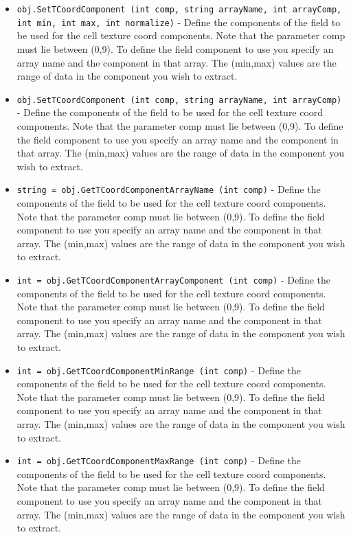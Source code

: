 \begin{itemize}
\item  \verb|obj.SetTCoordComponent (int comp, string arrayName, int arrayComp, int min, int max, int normalize)| -  Define the components of the field to be used for the cell texture coord
 components.  Note that the parameter comp must lie between (0,9). To
 define the field component to use you specify an array name and the
 component in that array. The (min,max) values are the range of data in
 the component you wish to extract.

\item  \verb|obj.SetTCoordComponent (int comp, string arrayName, int arrayComp)| -  Define the components of the field to be used for the cell texture coord
 components.  Note that the parameter comp must lie between (0,9). To
 define the field component to use you specify an array name and the
 component in that array. The (min,max) values are the range of data in
 the component you wish to extract.

\item  \verb|string = obj.GetTCoordComponentArrayName (int comp)| -  Define the components of the field to be used for the cell texture coord
 components.  Note that the parameter comp must lie between (0,9). To
 define the field component to use you specify an array name and the
 component in that array. The (min,max) values are the range of data in
 the component you wish to extract.

\item  \verb|int = obj.GetTCoordComponentArrayComponent (int comp)| -  Define the components of the field to be used for the cell texture coord
 components.  Note that the parameter comp must lie between (0,9). To
 define the field component to use you specify an array name and the
 component in that array. The (min,max) values are the range of data in
 the component you wish to extract.

\item  \verb|int = obj.GetTCoordComponentMinRange (int comp)| -  Define the components of the field to be used for the cell texture coord
 components.  Note that the parameter comp must lie between (0,9). To
 define the field component to use you specify an array name and the
 component in that array. The (min,max) values are the range of data in
 the component you wish to extract.

\item  \verb|int = obj.GetTCoordComponentMaxRange (int comp)| -  Define the components of the field to be used for the cell texture coord
 components.  Note that the parameter comp must lie between (0,9). To
 define the field component to use you specify an array name and the
 component in that array. The (min,max) values are the range of data in
 the component you wish to extract.


\end{itemize}
